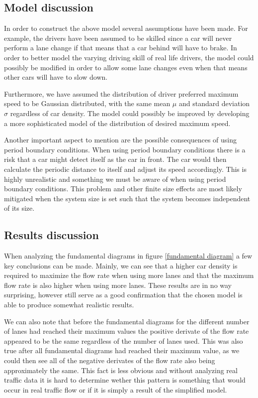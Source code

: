 \documentclass[a4paper,12pt]{article}
\begin{document}
\subsection*{Model discussion}
In order to construct the above model several assumptions have been made. For example, the drivers have been assumed to be skilled
since a car will never perform a lane change if that means that a car behind will have to brake. In order to better model the varying
driving skill of real life drivers, the model could possibly be modified in order to allow some lane changes even when that means other 
cars will have to slow down.

Furthermore, we have assumed the distribution of driver preferred maximum speed to be Gaussian distributed, with the same mean $\mu$ and standard
deviation $\sigma$ regardless of car density.
The model could possibly be improved by developing a more sophisticated model of the distribution of desired maximum speed.

Another important aspect to mention are the possible consequences of using period boundary conditions. When using period boundary conditions there is a risk
that a car might detect itself as the car in front. The car would then calculate the periodic distance to itself and adjust its speed accordingly. 
This is highly unrealistic and something we must be aware of when using period boundary conditions. This problem and other finite size effects are most
likely mitigated when the system size is set such that the system becomes independent of its size.

\subsection*{Results discussion}
When analyzing the fundamental diagrams in figure \ref*{fundamental diagram} a few key conclusions can be made.
Mainly, we can see that a higher car density is required to maximize the flow rate when using more lanes and that
the maximum flow rate is also higher when using more lanes. These results are in no way surprising, however still serve
as a good confirmation that the chosen model is able to produce somewhat realistic results. 

We can also note that before the fundamental diagrams for the different number of lanes had reached their maximum values the positive derivate of the flow rate appeared to be the same
regardless of the number of lanes used.
This was also true after all fundamental diagrams had reached their maximum value, as we could then see all of the negative derivates of the flow rate also being approximately the same.
This fact is less obvious and without analyzing real traffic data it is hard to determine wether this pattern is something that would occur in real traffic flow or if it is simply
a result of the simplified model. 
\end{document}
